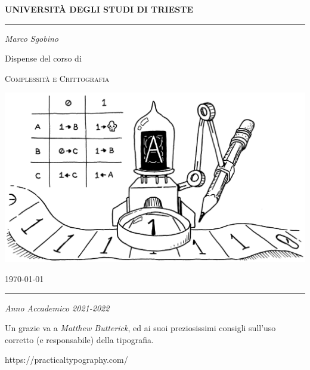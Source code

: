 \thispagestyle{plain}
\begin{titlepage}
        \begin{center}
                \Large
                \textbf{UNIVERSITÀ DEGLI STUDI DI TRIESTE}

                \par\noindent\rule{\textwidth}{0.8pt}
                \vspace*{0.6cm}

                \large
                \emph{Marco Sgobino}

                \large
                \vspace*{0.6cm}

                \Large Dispense del corso di
                \vspace*{0.6cm}

                \Huge
                \textsc{Complessità e Crittografia}
                \vspace*{.1cm}


                \vspace*{2cm}

                \begin{center}
                        \includegraphics[width=.9\textwidth, keepaspectratio]{./pics/turing-machine-titlepage.png}
                \end{center}
                \vspace*{1cm}
                \large
                \today


                \vfill

                \par\noindent\rule{\textwidth}{0.8pt}
                \vspace*{0.6cm}
                \large
                \emph{Anno Accademico 2021-2022}

                \newpage

                \thispagestyle{plain}
                \vspace*{0.5cm}
                \vfill
                \large

                Un grazie va a \emph{Matthew Butterick}, ed ai suoi preziosissimi consigli sull'uso corretto (e responsabile) della tipografia.

                https://practicaltypography.com/

        \end{center}
\end{titlepage}

